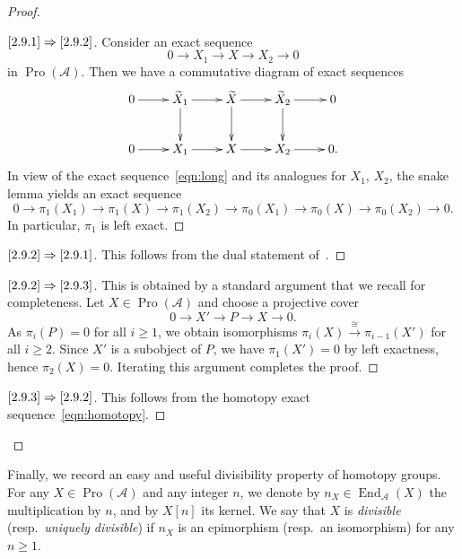 \documentclass[11pt]{article}
\theoremstyle{definition}
\newenvironment{proofc}{\begin{proof}}{\end{proof}}
\numberwithin{equation}{section}
\newcommand\cA{{\mathcal A}}
\newcommand\tX{{\widetilde X}}
\DeclareMathOperator{\End}{End}
\DeclareMathOperator{\Pro}{Pro}
\newenvironment{step}[1]{\begin{proof}[#1]}{\let\qed\relax\end{proof}}
\newenvironment{laststep}[1]{\begin{proof}[#1]}{\end{proof}}
\renewenvironment{proofc}{\begin{proof}}{\end{proof}}
\theoremstyle{remark}
\begin{document}
\goodbreak
\begin{proofc}
\begin{step}{$\eqref{2.9.1}\Rightarrow\eqref{2.9.2}$}%
Consider an exact sequence
\[
0 \longrightarrow X_1 \longrightarrow X
\longrightarrow X_2 \longrightarrow 0
\]
in $\Pro(\cA)$. Then we have a commutative diagram of exact sequences
\[
\xymatrix{ 0 \ar[r] & \tX_1 \ar[r] \ar[d] & \tX \ar[r] \ar[d] & \tX_2 \ar[r] \ar[d] & 0 \\
0 \ar[r] & X_1 \ar[r] & X \ar[r] & X_2 \ar[r] & 0. \\
}
\]
In view of the exact sequence~\eqref{eqn:long} and its analogues for $X_1$, $X_2$, the snake lemma yields an exact sequence
\[
0 \to \pi_1(X_1) \to \pi_1(X)
\to \pi_1(X_2) \to \pi_0(X_1)
\to \pi_0(X) \to \pi_0(X_2) \to 0.
\]
In particular, $\pi_1$ is left exact.
\end{step}

\begin{step}{$\eqref{2.9.2}\Rightarrow\eqref{2.9.1}$}%
This follows from the dual statement of~\cite[III.3.Prop.~7]{Gabriel}.
\end{step}

\begin{step}{$\eqref{2.9.2}\Rightarrow\eqref{2.9.3}$}%
This is obtained by a standard argument that we recall for completeness. Let $X \in \Pro(\cA)$ and choose a projective cover
\[
0 \longrightarrow X' \longrightarrow P
\longrightarrow X \longrightarrow 0.
\]
As $\pi_i(P) = 0$ for all $i \geq 1$, we obtain isomorphisms $\pi_i(X) \stackrel{\cong}{\to} \pi_{i - 1}(X')$ for all $i \geq 2$. Since $X'$ is a subobject of $P$, we have $\pi_1(X') = 0$ by left exactness, hence $\pi_2(X) = 0$. Iterating this argument completes the proof.
\end{step}

\begin{laststep}{$\eqref{2.9.3}\Rightarrow\eqref{2.9.2}$}%
This follows from the homotopy exact sequence~\eqref{eqn:homotopy}.
\end{laststep}
\let\qed\relax
\end{proofc}


Finally, we record an easy and useful divisibility property of homotopy groups. For any $X \in \Pro(\cA)$ and any integer $n$, we denote by $n_X \in \End_{\cA}(X)$ the multiplication by $n$, and by $X[n]$ its kernel. We say that $X$ is \emph{divisible} (resp.~\emph{uniquely divisible}) if $n_X$ is an epimorphism (resp.~an isomorphism) for any $n \geq 1$.
\end{document}
